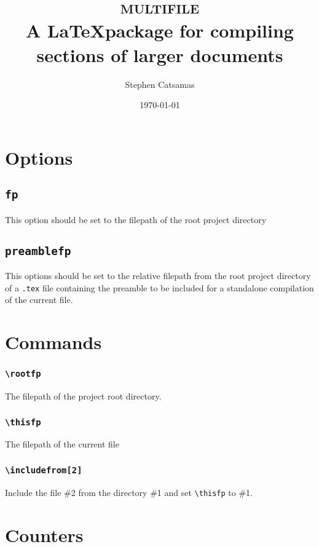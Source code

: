 \documentclass{article}
\title{\Huge\textsc{multifile} \\\vspace*{1 em}
    \large A \LaTeX package for compiling sections of larger documents}
\author{Stephen Catsamas}
\date{\today}
\begin{document}
\maketitle
\tableofcontents


\section{Options}
\subsection{\texttt{fp}}\label{sec:opt:fp}
    This option should be set to the filepath of the root project directory

\subsection{\texttt{preamblefp}}\label{sec:opt:preamblefp}
    This options should be set to the relative filepath from the root project directory of a \texttt{.tex} file containing the preamble to be included for a standalone compilation of the current file. 

\section{Commands}

\subsubsection{\texttt{\textbackslash rootfp}}
    The filepath of the project root directory.

\subsubsection{\texttt{\textbackslash thisfp}}
    The filepath of the current file

\subsubsection{\texttt{\textbackslash includefrom[2]}}
    Include the file \#2 from the directory \#1 and set \texttt{\textbackslash thisfp} to \#1.

\section{Counters}
\end{document}
